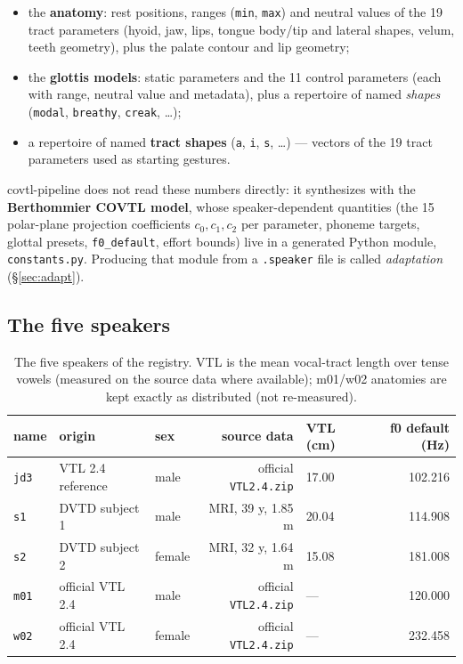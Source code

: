 \documentclass[11pt,a4paper]{article}
\newcommand{\speakerfile}[1]{\texttt{#1.speaker}}
\newcommand{\code}[1]{\texttt{#1}}
\begin{document}
\begin{itemize}[leftmargin=1.5em]
\item the \textbf{anatomy}: rest positions, ranges (\texttt{min},
      \texttt{max}) and neutral values of the 19 tract parameters
      (hyoid, jaw, lips, tongue body/tip and lateral shapes, velum,
      teeth geometry), plus the palate contour and lip geometry;
\item the \textbf{glottis models}: static parameters and the 11
      control parameters (each with range, neutral value and
      metadata), plus a repertoire of named \emph{shapes}
      (\texttt{modal}, \texttt{breathy}, \texttt{creak}, \ldots);
\item a repertoire of named \textbf{tract shapes} (\texttt{a},
      \texttt{i}, \texttt{s}, \ldots) --- vectors of the 19 tract
      parameters used as starting gestures.
\end{itemize}

covtl-pipeline does not read these numbers directly: it synthesizes
with the \textbf{Berthommier COVTL model}, whose speaker-dependent
quantities (the 15 polar-plane projection coefficients
\(c_0, c_1, c_2\) per parameter, phoneme targets, glottal presets,
\texttt{f0\_default}, effort bounds) live in a generated Python
module, \code{constants.py}. Producing that module from a
\speakerfile{} file is called \emph{adaptation}
(\S\ref{sec:adapt}).

\subsection{The five speakers}

\begin{table}[ht]
\centering
\small
\begin{tabular}{@{}lllrlr@{}}
\toprule
\textbf{name} & \textbf{origin} & \textbf{sex} & \textbf{source data} &
\textbf{VTL (cm)} & \textbf{f0 default (Hz)} \\
\midrule
\code{jd3} & VTL 2.4 reference & male & official \texttt{VTL2.4.zip} & 17.00 & 102.216 \\
\code{s1}  & DVTD subject 1 & male & MRI, 39 y, 1.85 m & 20.04 & 114.908 \\
\code{s2}  & DVTD subject 2 & female & MRI, 32 y, 1.64 m & 15.08 & 181.008 \\
\code{m01} & official VTL 2.4 & male & official \texttt{VTL2.4.zip} & --- & 120.000 \\
\code{w02} & official VTL 2.4 & female & official \texttt{VTL2.4.zip} & --- & 232.458 \\
\bottomrule
\end{tabular}
\caption{The five speakers of the registry. VTL is the mean vocal-tract
length over tense vowels (measured on the source data where
available); m01/w02 anatomies are kept exactly as distributed (not
re-measured).}
\label{tab:speakers}
\end{table}
\end{document}
